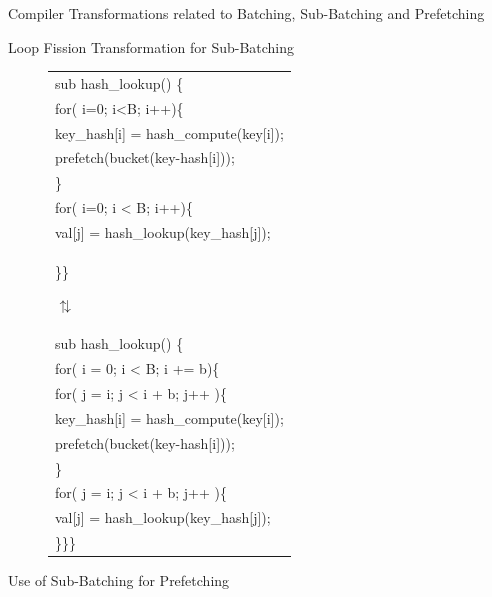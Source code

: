 \documentclass[final]{beamer}
\newlength{\sepwid}
\newlength{\onecolwid}
\newlength{\twocolwid}
\begin{document}
\begin{frame}
\begin{columns}[t]
\begin{column}{\twocolwid}
\begin{exampleblock}{Compiler Transformations related to Batching, Sub-Batching and Prefetching}
\begin{multicols}{3}
Loop Fission Transformation for Sub-Batching
\begin{figure}[ht]
\begin{tiny}
\begin{tabular}[b]{p{\onecolwid}}

sub\hspace{0.2\sepwid} hash\_lookup() \{\\
\hspace{0.4\sepwid}for( i=0; i<B; i++)\{\\
\hspace{0.6\sepwid}key\_hash[i] = hash\_compute(key[i]);\\
\hspace{0.6\sepwid}prefetch(bucket(key-hash[i]));\\
\hspace{0.4\sepwid}\}\\
\hspace{0.4\sepwid}for( i=0; i < B; i++)\{\\
\hspace{0.6\sepwid}val[j] = hash\_lookup(key\_hash[j]);\\
\}\hspace{0.4\sepwid}\}

\hspace{1\sepwid}$\updownarrows$\\
 
sub{ hash\_lookup()} \{\\
\hspace{0.4\sepwid}for( i = 0; i < B; i += b)\{\\
\hspace{0.6\sepwid}for( j = i; j < i + b; j++ )\{\\
\hspace{0.8\sepwid}key\_hash[i] = hash\_compute(key[i]);\\
\hspace{0.8\sepwid}prefetch(bucket(key-hash[i]));\\
\hspace{0.6\sepwid}\}\\
\hspace{0.6\sepwid}for( j = i; j < i + b; j++ )\{\\
\hspace{0.8\sepwid}val[j] = hash\_lookup(key\_hash[j]);\\
\}\hspace{0.4\sepwid}\}\hspace{0.2\sepwid}\}
\end{tabular}
\end{tiny}
\end{figure}
Use of Sub-Batching for Prefetching
\end{multicols}
\end{exampleblock}


\end{column}
\end{columns}
\end{frame}
\end{document}
